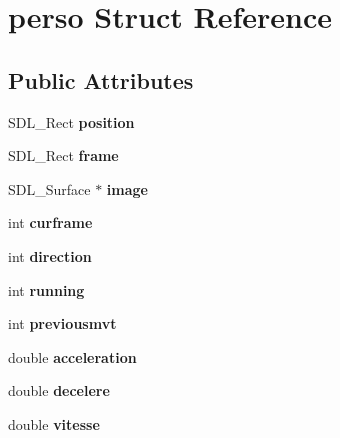 \hypertarget{structperso}{}\section{perso Struct Reference}
\label{structperso}
\subsection*{Public Attributes}
\begin{DoxyCompactItemize}
\item 
\mbox{\label{structperso_a74aed265eb926987cf218b19d163c746}} 
S\+D\+L\+\_\+\+Rect {\bfseries position}
\item 
\mbox{\label{structperso_a1131a2be46ede188e4a1b1deaa571ac3}} 
S\+D\+L\+\_\+\+Rect {\bfseries frame}
\item 
\mbox{\label{structperso_a3bb43b8e820b3ba348b6c96458b39231}} 
S\+D\+L\+\_\+\+Surface $\ast$ {\bfseries image}
\item 
\mbox{\label{structperso_a42024f8d59853b3b8ac8eab03b041b78}} 
int {\bfseries curframe}
\item 
\mbox{\label{structperso_a76b41475467835b866812bdbaafb6909}} 
int {\bfseries direction}
\item 
\mbox{\label{structperso_a40ed5138424098e2cd325293a4bf0aa4}} 
int {\bfseries running}
\item 
\mbox{\label{structperso_add01ce0efa43bdfb66cec9231b19427a}} 
int {\bfseries previousmvt}
\item 
\mbox{\label{structperso_ad3971b284a76653a87a21002e21e218d}} 
double {\bfseries acceleration}
\item 
\mbox{\label{structperso_ae94660e979e793c8486ec17e09984ea2}} 
double {\bfseries decelere}
\item 
\mbox{\label{structperso_a901c4457de0ecf9346dfbfbd9f0a591e}} 
double {\bfseries vitesse}
\item 
\mbox{\label{structperso_a468cd8e792335ed45d314f51f0bbd40c}} 

\end{DoxyCompactItemize}
